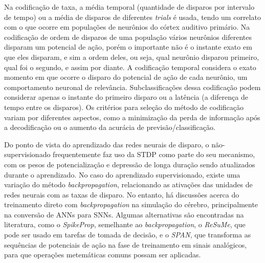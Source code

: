Na codificação de taxa, a média temporal (quantidade de disparos por intervalo de tempo) ou a média de disparos de diferentes \textit{trials} é usada, tendo um correlato com o que ocorre em populações de neurônios do córtex auditivo primário.
Na codificação de ordem de disparos de uma população vários neurônios diferentes disparam um potencial de ação, porém o importante não é o instante exato em que eles disparam, e sim a ordem deles, ou seja, qual neurônio disparou primeiro, qual foi o segundo, e assim por diante.
A codificação temporal considera o exato momento em que ocorre o disparo do potencial de ação de cada neurônio, um comportamento neuronal de relevância.
Subclassificações dessa codificação podem considerar apenas o instante do primeiro disparo ou a latência (a diferença de tempo entre os disparos). Os critérios para seleção do método de codificação variam por diferentes aspectos, como a minimização da perda de informação após a decodificação ou o aumento da acurácia de previsão/classificação.

Do ponto de vista do aprendizado das redes neurais de disparo, o não-supervisionado frequentemente faz uso da STDP como parte do seu mecanismo, com os pesos de potencialização e depressão de longa duração sendo atualizados durante o aprendizado.
No caso do aprendizado supervisionado, existe uma variação do método \textit{backpropagation}, relacionando as ativações das unidades de redes neurais com as taxas de disparo.
No entanto, há discussões acerca do treinamento direto com \textit{backpropagation} na simulação do cérebro, principalmente na conversão de ANNs para SNNs. Algumas alternativas são encontradas na literatura, como o \textit{SpikeProp}, semelhante ao \textit{backpropagation},
o \textit{ReSuMe}, que pode ser usado em tarefas de tomada de decisão,
e o \textit{SPAN}, que transforma as sequências de potenciais de ação na fase de treinamento em sinais analógicos, para que operações metemáticas comuns possam ser aplicadas.


